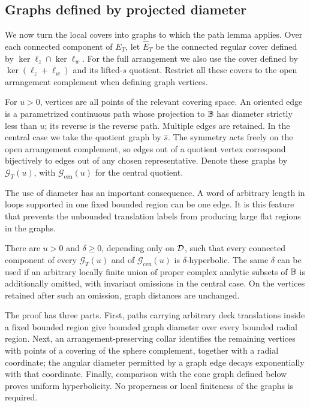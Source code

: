 \subsection{Graphs defined by projected diameter}

We now turn the local covers into graphs to which the path lemma
applies.  Over each connected component of $E_T$, let
$\widehat E_T$ be the connected regular cover defined by
$\ker\ell_z\cap\ker\ell_w$.  For the full arrangement we also use
the cover defined by $\ker(\ell_z+\ell_w)$ and its lifted-$s$
quotient.  Restrict all these covers to the open arrangement
complement when defining graph vertices.

For $u>0$, vertices are all points of the relevant covering space.
An oriented edge is a parametrized continuous path whose projection
to $\mathbb B$ has diameter strictly less than $u$; its reverse is the
reverse path.  Multiple edges are retained.  In the central case
we take the quotient graph by $\widehat s$.  The symmetry acts
freely on the open arrangement complement, so edges out of a
quotient vertex correspond bijectively to edges out of any chosen
representative.  Denote these graphs by $\mathcal G_T(u)$, with
$\mathcal G_{\mathrm{cen}}(u)$ for the central quotient.

The use of diameter has an important consequence.  A word of
arbitrary length in loops supported in one fixed bounded region
can be one edge.  It is this feature that prevents the unbounded
translation labels from producing large flat regions in the
graphs.

\begin{proposition}\label{prop:model-hyperbolicity}
There are $u>0$ and $\delta\ge0$, depending only on $\mathcal D$, such that
every connected component of every $\mathcal G_T(u)$ and of
$\mathcal G_{\mathrm{cen}}(u)$ is $\delta$-hyperbolic.
The same $\delta$ can be used if an arbitrary locally finite union
of proper complex analytic subsets of $\mathbb B$ is additionally
omitted, with invariant omissions in the central case.  On the
vertices retained after such an omission, graph distances are
unchanged.
\end{proposition}

The proof has three parts.  First, paths carrying arbitrary deck
translations inside a fixed bounded region give bounded graph diameter
over every bounded radial region.  Next, an arrangement-preserving
collar identifies the remaining vertices with points of a covering of
the sphere complement, together with a radial coordinate; the angular
diameter permitted by a graph edge decays exponentially with that
coordinate.  Finally, comparison with the cone graph defined below
proves uniform hyperbolicity.  No properness or local finiteness of the
graphs is required.

